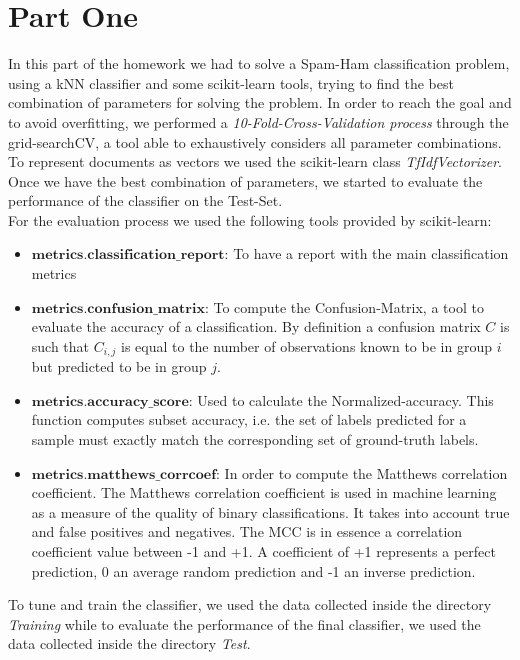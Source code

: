 \documentclass[11pt]{article}
\begin{document}
\section{Part One}
In this part of the homework we had to solve a Spam-Ham classification problem, using a kNN classifier and some scikit-learn tools, trying to find the best combination of parameters for solving the problem. In order to reach the goal and to avoid overfitting, we performed a \textit{10-Fold-Cross-Validation process} through the grid-searchCV, a tool able to exhaustively considers all parameter combinations. To represent documents as vectors we used the scikit-learn class \textit{TfIdfVectorizer}.  Once we have the best combination of parameters, we started to evaluate the performance of the classifier on the Test-Set.  \\
For the evaluation process we used the following tools provided by scikit-learn:\\
\begin{itemize}
\item{$\textbf{metrics.classification\_report:}$} To have a report with the main classification metrics
\item{$\textbf{metrics.confusion\_matrix:}$} To compute the Confusion-Matrix, a tool to evaluate the accuracy of a classification. By definition a confusion matrix $C$ is such that $C_{i, j}$ is equal to the number of observations known to be in group $i$ but predicted to be in group $j$. 
\item{$\textbf{metrics.accuracy\_score:}$} Used to calculate the Normalized-accuracy. This function computes subset accuracy, i.e. the set of labels predicted for a sample must exactly match the corresponding set of ground-truth labels. 
\item{$\textbf{metrics.matthews\_corrcoef:}$} In order to compute the Matthews correlation coefficient. The Matthews correlation coefficient is used in machine learning as a measure of the quality of binary classifications. It takes into account true and false positives and negatives. The MCC is in essence a correlation coefficient value between -1 and +1. A coefficient of +1 represents a perfect prediction, 0 an average random prediction and -1 an inverse prediction. 
\end{itemize}
To tune and train the classifier, we used the data collected inside the directory \textit{Training} while to evaluate the performance of the final classifier, we used the data collected inside the directory \textit{Test}.\\
\end{document}
